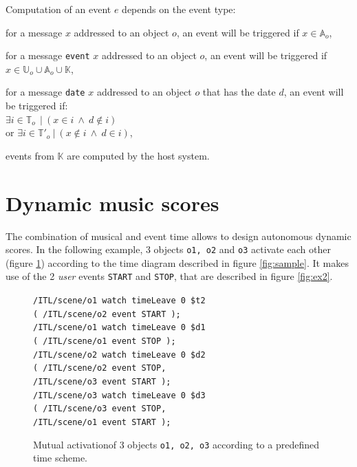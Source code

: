 \documentclass{article}
\newcommand{\OSC}[1]	{{\fontsize{9pt}{9pt} \selectfont\texttt{#1}}}
\newcommand{\tab}{\hspace*{4mm}}
\let\olditemize\itemize
\let\oldenditemize\enditemize
\renewenvironment{itemize} 	{\olditemize \renewcommand{\labelitemi}{$\bullet$} \setlength{\itemsep}{0mm}}{\oldenditemize}
\newcommand{\sample}[1]		{\vspace{-0.2em}\begin{center}\colorbox{mygrey}{\begin{minipage}[t]{0.98\columnwidth} {\small \texttt{#1}}\end{minipage}}\end{center}}
\begin{document}
Computation of an event $e$ depends on the event type:
\begin{itemize}
\item[-] for a message $x$ addressed to an object $o$, an event will be triggered if $x \in \mathbb{A}_o$, 
\item[-] for a message \OSC{event} $x$ addressed to an object $o$, an event will be triggered if $x \in \mathbb{U}_o \cup \mathbb{A}_o \cup  \mathbb{K}$,
\item[-] for a message \OSC{date} $x$ addressed to an object $o$ that has the date $d$, an event will be triggered if:\\ 
\hspace*{3.5mm} $\exists i \in \mathbb{T}_o\ \ |\ (x \in i\ \land\ d \not\in i)$ \\
or $\exists i \in \mathbb{T'}_o\ |\ (x \not \in i\ \land\ d \in i)$,
\item[-] events from $\mathbb{K}$ are computed by the host system.
\end{itemize}

\section{Dynamic music scores}

The combination of musical and event time allows to design autonomous dynamic scores. In the following example, 3 objects \OSC{o1, o2} and \OSC{o3} activate each other (figure \ref{fig:ex1}) according to the time diagram described in figure \ref{fig:sample}. It makes use of the 2 \emph{user} events \OSC{START} and \OSC{STOP}, that are described in figure \ref{fig:ex2}.

\begin{figure}[h]
   \centering
\sample{/ITL/scene/o1 watch timeLeave 0 \$t2 \\
   \tab( /ITL/scene/o2 event START );\\
	/ITL/scene/o1 watch timeLeave 0 \$d1 \\
	\tab( /ITL/scene/o1 event STOP );\\
	/ITL/scene/o2 watch timeLeave 0 \$d2 \\
	\tab( /ITL/scene/o2 event STOP, \\
	\tab \tab/ITL/scene/o3 event START );\\
	/ITL/scene/o3 watch timeLeave 0 \$d3 \\
	\tab( /ITL/scene/o3 event STOP, \\
	\tab \tab/ITL/scene/o1 event START );
}
   \caption{Mutual activationof 3 objects \OSC{o1, o2, o3} according to a predefined time scheme.}
   \label{fig:ex1}
\end{figure}
\end{document}
